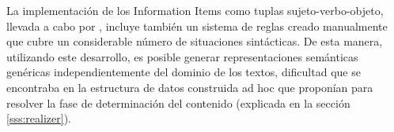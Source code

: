 La implementación de los Information Items como tuplas sujeto-verbo-objeto, llevada a cabo por \cite{genest2010text}, incluye también un sistema de reglas creado manualmente que cubre un considerable número de situaciones sintácticas. De esta manera, utilizando este desarrollo, es posible generar representaciones semánticas genéricas independientemente del dominio de los textos, dificultad que se encontraba en la estructura de datos construida ad hoc que proponían \cite{biblia} para resolver la fase de determinación del contenido (explicada en la sección \ref{sss:realizer}).